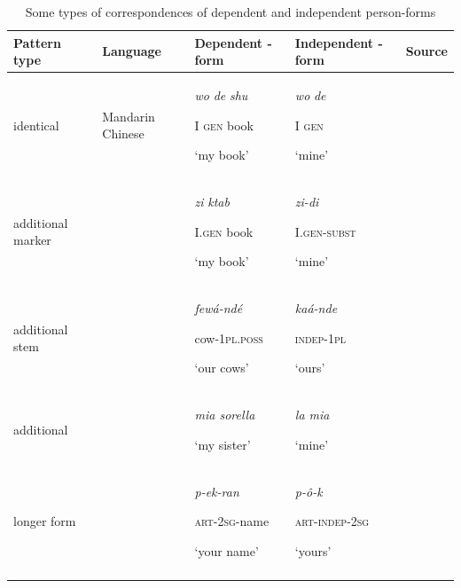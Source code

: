 \documentclass[output=paper]{langsci/langscibook}
\begin{document}
\begin{table}
\small
\begin{tabularx}{\textwidth}{Qp{2cm}XXp{2cm}}
\lsptoprule

\bfseries Pattern type & \bfseries Language & \bfseries Dependent -form & \bfseries Independent -form & \bfseries Source\\
\midrule
identical & Mandarin  Chinese & \textit{wo}   \textit{de}  \textit{shu}


I   \textsc{gen}  book

‘my book’ & \textit{wo}  \textit{de~}

I  \textsc{gen}

‘mine’ & \\
\tablevspace

additional marker &  & \textit{zi}  \textit{ktab}

I.\textsc{gen}  book

‘my book’ & \textit{zi-di}

I.\textsc{gen-subst}

‘mine’ & \citet[110]{Haspelmath1993}\\

\tablevspace
additional stem &  & \textit{fewá-ndé}

cow-\textsc{1pl.poss}

‘our cows’ & \textit{kaá{}-nde}

\textsc{indep-1pl}

‘ours’ & \citet[31f.]{Cyffer1998_Kanuri}\\


\tablevspace
additional ~ &  & \textit{mia sorella}

‘my sister’ & \textit{la mia}

‘mine’ & \citet[44,286f.]{Schwarze1988}\\


\tablevspace
longer form &  & \textit{p-ek-ran}

\textsc{art-2sg}{}-name

‘your name’ & \textit{p-ô}\textit{{}-k}

\textsc{art-indep-2sg}

‘yours’ & \citet[277]{Haspelmath2015}\\
\lspbottomrule
\end{tabularx}

\caption{Some types of correspondences of dependent and independent person-forms}
\label{tab:michaelis:1}
\end{table}
\end{document}
